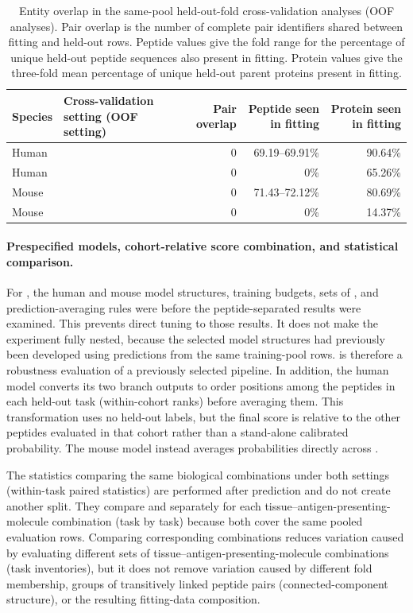 \begin{table}[tbp]
\centering
\caption{Entity overlap in the same-pool held-out-fold cross-validation analyses (OOF analyses). Pair overlap is the number of complete pair identifiers shared between fitting and held-out rows. Peptide values give the fold range for the percentage of unique held-out peptide sequences also present in fitting. Protein values give the three-fold mean percentage of unique held-out parent proteins present in fitting.}
\label{tab:oof-overlap-audit}
\scriptsize
\setlength{\tabcolsep}{3pt}
\begin{tabular}{llrrr}
\toprule
Species & Cross-validation setting (OOF setting) & Pair overlap & Peptide seen in fitting & Protein seen in fitting \\
\midrule
Human & \plainMatchedOOF{} & 0 & 69.19--69.91\% & 90.64\% \\
Human & \plainPeptideOOF{} & 0 & 0\% & 65.26\% \\
Mouse & \plainMatchedOOF{} & 0 & 71.43--72.12\% & 80.69\% \\
Mouse & \plainPeptideOOF{} & 0 & 0\% & 14.37\% \\
\bottomrule
\end{tabular}
\end{table}

\paragraph{Prespecified models, cohort-relative score combination, and statistical comparison.}
For \plainPeptideOOF{}, the human and mouse model structures, training budgets, sets of \plainSeeds{}, and prediction-averaging rules were \plainFrozen{} before the peptide-separated results were examined. This prevents direct tuning to those results. It does not make the experiment fully nested, because the selected model structures had previously been developed using \plainPairOOF{} predictions from the same training-pool rows. \plainPeptideOOF{} is therefore a robustness evaluation of a previously selected pipeline. In addition, the human model converts its two branch outputs to order positions among the peptides in each held-out task (within-cohort ranks) before averaging them. This transformation uses no held-out labels, but the final score is relative to the other peptides evaluated in that cohort rather than a stand-alone calibrated probability. The mouse model instead averages probabilities directly across \plainSeeds{}.

The statistics comparing the same biological combinations under both settings (within-task paired statistics) are performed after prediction and do not create another split. They compare \plainMatchedOOF{} and \plainPeptideOOF{} separately for each tissue--antigen-presenting-molecule combination (task by task) because both cover the same pooled evaluation rows. Comparing corresponding combinations reduces variation caused by evaluating different sets of tissue--antigen-presenting-molecule combinations (task inventories), but it does not remove variation caused by different fold membership, groups of transitively linked peptide pairs (connected-component structure), or the resulting fitting-data composition.

